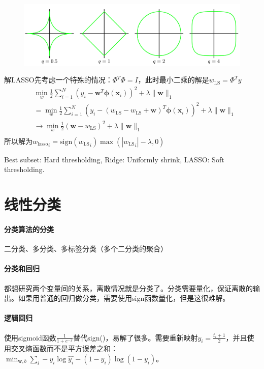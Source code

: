 \begin{figure}[H]
\centering
\includegraphics[width=0.7\columnwidth]{sl/1.png}
\end{figure}


解LASSO先考虑一个特殊的情况：$\Phi^T\Phi = I$，此时最小二乘的解是$w_\mathrm{LS} = \Phi^Ty$
$$
\begin{aligned}
    &\min_w \frac{1}{2}\sum^N_{i=1}(y_i - \bm w^T\bm\phi(\bm x_i))^2 + \lambda\|\bm w\|_1 \\
    &=\! \min_w \frac{1}{2}\sum^N_{i=1}(y_i\! - (w_\mathrm{LS}\! - w_\mathrm{LS}\! +\! \bm w)^T\bm\phi(\bm x_i))^2\! +\! \lambda\|\bm w\|_1 \\
    &\to \min_w \frac{1}{2}(\bm w - w_\mathrm{LS})^2 + \lambda\|\bm w\|_1 \\
\end{aligned}
$$
所以解为${w_\mathrm{lasso}}_i = \mathrm{sign}({w_\mathrm{LS}}_i) \max (|{w_\mathrm{LS}}_i| - \lambda, 0)$

Best subset: Hard thresholding,
Ridge: Uniformly shrink,
LASSO: Soft thresholding.



\section{线性分类}

\paragraph{分类算法的分类}二分类、多分类、多标签分类（多个二分类的聚合）

\paragraph{分类和回归} 都想研究两个变量间的关系，离散情况就是分类了。分类需要量化，保证离散的输出。如果用普通的回归做分类，需要使用sign函数量化，但是这很难解。

\paragraph{逻辑回归} 使用sigmoid函数$\frac{1}{1+e^{-x}}$替代sign()，易解了很多。需要重新映射$y_i = \frac{t_i + 1}{2}$，并且使用交叉熵函数而不是平方误差之和：$\min_{\bm w, b} \sum_i - y_i\log\hat{y_i} - (1-y_i)\log(1-y_i)。$

